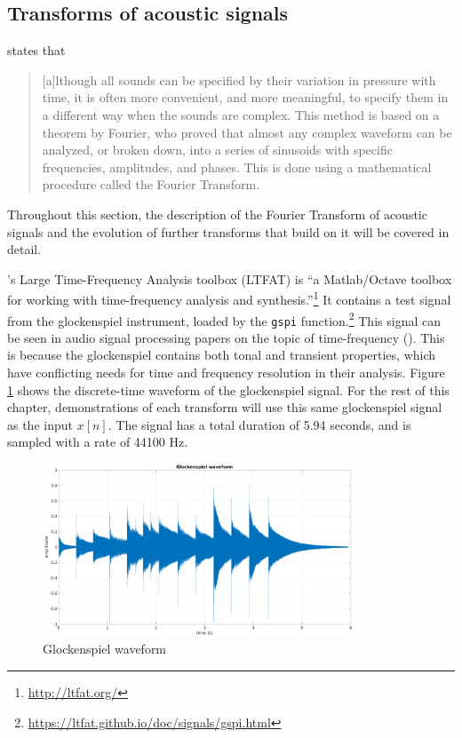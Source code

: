 \documentclass[report.tex]{subfiles}
\begin{document}
\subsection{Transforms of acoustic signals}
\label{sec:freqdomain}

\textcite[Chapter~2B]{moore} states that

\begin{quote}
	[a]lthough all sounds can be specified by their variation in pressure with time, it is often more convenient, and more meaningful, to specify them in a different way when the sounds are complex. This method is based on a theorem by Fourier, who proved that almost any complex waveform can be analyzed, or broken down, into a series of sinusoids with specific frequencies, amplitudes, and phases. This is done using a mathematical procedure called the Fourier Transform.
\end{quote}

Throughout this section, the description of the Fourier Transform of acoustic signals and the evolution of further transforms that build on it will be covered in detail.

\textcite{ltfat}'s Large Time-Frequency Analysis toolbox (LTFAT) is ``a Matlab/Octave toolbox for working with time-frequency analysis and synthesis.''\footnote{\url{http://ltfat.org/}} It contains a test signal from the glockenspiel instrument, loaded by the \Verb#gspi# function.\footnote{\url{https://ltfat.github.io/doc/signals/gspi.html}} This signal can be seen in audio signal processing papers on the topic of time-frequency (\cite{doerflerphd, balazs, jaillet, tfjigsaw, invertiblecqt, wmdct}). This is because the glockenspiel contains both tonal and transient properties, which have conflicting needs for time and frequency resolution in their analysis. Figure \ref{fig:glockwaveform} shows the discrete-time waveform of the glockenspiel signal. For the rest of this chapter, demonstrations of each transform will use this same glockenspiel signal as the input $x[n]$. The signal has a total duration of 5.94 seconds, and is sampled with a rate of 44100 Hz.

\begin{figure}[ht]
	\centering
	\includegraphics[width=0.825\textwidth]{./images-gspi/gspi_time_domain.png}
	\caption{Glockenspiel waveform}
	\label{fig:glockwaveform}
\end{figure}
\end{document}
